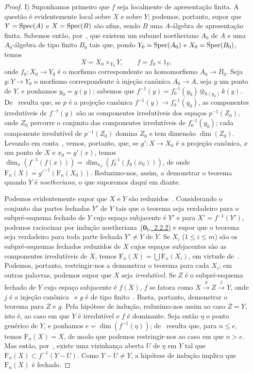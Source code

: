 \begin{proof}
I) Suponhamos primeiro que $f$ seja localmente de apresentação finita.
A questão é evidentemente local sobre $X$ e sobre $Y$; podemos, portanto,
supor que $Y=\operatorname{Spec}(A)$ e $X=\operatorname{Spec}(B)$ são afins,
sendo $B$ uma $A$-álgebra de apresentação finita.
Sabemos então, por~, que existem um subanel noetheriano $A_0$
de $A$ e uma $A_0$-álgebra de tipo finito $B_0$ tais que, pondo
$Y_0=\operatorname{Spec}(A_0)$ e $X_0=\operatorname{Spec}(B_0)$, temos
\[
X=X_0\times_{Y_0}Y,\qquad f=f_0\times 1_Y,
\]
onde $f_0:X_0\to Y_0$ é o morfismo correspondente ao homomorfismo $A_0\to B_0$.
Seja $g:Y\to Y_0$ o morfismo correspondente à injeção canônica $A_0\to A$,
seja $y$ um ponto de $Y$, e ponhamos $y_0=g(y)$;
sabemos que $f^{-1}(y)=f_0^{-1}(y_0)\otimes_{k(y_0)}k(y)$.
De~ resulta que, se $p$ é a projeção canônica
$f^{-1}(y)\to f_0^{-1}(y_0)$, as componentes irredutíveis de $f^{-1}(y)$
são as componentes irredutíveis dos espaços $p^{-1}(Z_0)$,
onde $Z_0$ percorre o conjunto das componentes irredutíveis de $f_0^{-1}(y_0)$;
cada componente irredutível de $p^{-1}(Z_0)$ domina $Z_0$
e tem dimensão $\dim(Z_0)$.
Levando em conta~, vemos, portanto, que,
se $g':X\to X_0$ é a projeção canônica, $x$ um ponto de $X$ e $x_0=g'(x)$,
temos $\dim_x(f^{-1}(f(x)))=\dim_{x_0}(f_0^{-1}(f_0(x_0)))$,
de onde $\mathrm{F}_n(X)={g'}^{-1}(\mathrm{F}_n(X_0))$.
Reduzimo-nos, assim, a demonstrar o teorema quando $Y$ é \emph{noetheriano},
o que suporemos daqui em diante.

Podemos evidentemente supor que $X$ e $Y$ são reduzidos~.
Considerando o conjunto das partes fechadas $Y'$ de $Y$ tais que o teorema
seja verdadeiro para o subpré-esquema fechado de $Y$ cujo espaço subjacente
é $Y'$ e para $X'=f^{-1}(Y')$, podemos raciocinar por indução
noetheriana~\hyperref[0.2.2.2]{($\mathbf{0}_{\mathrm{I}}$,~2.2.2)}
e supor que o teorema seja verdadeiro para toda parte fechada $Y'\neq Y$ de $Y$.
Se $X_i$ ($1\leq i\leq m$) são os subpré-esquemas fechados reduzidos de $X$
cujos espaços subjacentes são as componentes irredutíveis de $X$,
temos $\mathrm{F}_n(X)=\bigcup\mathrm{F}_n(X_i)$,
em virtude de~.
Podemos, portanto, restringir-nos a demonstrar o teorema para cada $X_i$;
em outras palavras, podemos supor que $X$ seja \emph{irredutível}.
Se $Z$ é o subpré-esquema fechado de $Y$ cujo espaço subjacente é
$\overline{f(X)}$, $f$ se fatora como $X\xrightarrow{g}Z\xrightarrow{j}Y$,
onde $j$ é a injeção canônica~
e $g$ é de tipo finito~.
Basta, portanto, demonstrar o teorema para $Z$ e $g$.
Pela hipótese de indução, reduzimo-nos assim ao caso $Z=Y$,
isto é, ao caso em que $Y$ é irredutível e $f$ é dominante.
Seja então $\eta$ o ponto genérico de $Y$, e ponhamos $e=\dim(f^{-1}(\eta))$;
de~ resulta que, para $n\leq e$, temos $\mathrm{F}_n(X)=X$,
de modo que podemos restringir-nos ao caso em que $n>e$.
Mas então, por~, existe uma vizinhança aberta $U$ de $\eta$
em $Y$ tal que $\mathrm{F}_n(X)\subset f^{-1}(Y-U)$.
Como $Y-U\neq Y$, a hipótese de indução implica que $\mathrm{F}_n(X)$ é fechado.


\end{proof}
